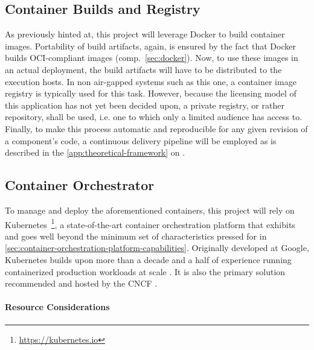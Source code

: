 \subsection{Container Builds and Registry}
\label{sec:deployment-container-builds-and-registry}

As previously hinted at, this project will leverage Docker to build container images. Portability of build artifacts, again, is ensured by the fact that Docker builds \acs{OCI}-compliant images (comp.~\autoref{sec:docker}). Now, to use these images in an actual deployment, the build artifacts will have to be distributed to the execution hosts. In non air-gapped systems such as this one, a container image registry is typically used for this task. However, because the licensing model of this application has not yet been decided upon, a private registry, or rather repository, shall be used, i.e. one to which only a limited audience has access to. Finally, to make this process automatic and reproducible for any given revision of a component's code, a continuous delivery pipeline will be employed as is described in the \autoref{app:theoretical-framework} on .


\subsection{Container Orchestrator}
\label{sec:deployment-container-orchestrator}

To manage and deploy the aforementioned containers, this project will rely on Kubernetes~\footnote{\url{https://kubernetes.io}}, a state-of-the-art container orchestration platform that exhibits and goes well beyond the minimum set of characteristics pressed for in \autoref{sec:container-orchestration-platform-capabilities}. Originally developed at Google, Kubernetes builds upon more than a decade and a half of experience running containerized production workloads at scale \cite[p.~50]{burns2016borg}. It is also the primary solution recommended and hosted by the \acl*{CNCF} \cite[p.~13]{pahl2017cloud}.


\paragraph{Resource Considerations}

